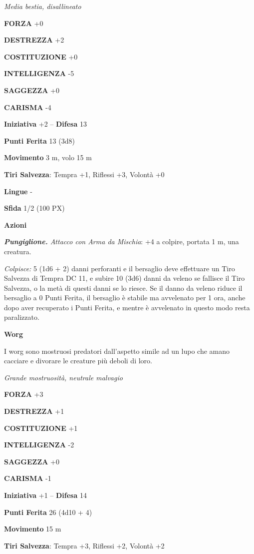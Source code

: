 \begin{multicols}{2}
\textit{Media bestia, disallineato}

\textbf{FORZA} +0

\textbf{DESTREZZA} +2

\textbf{COSTITUZIONE} +0

\textbf{INTELLIGENZA} -5

\textbf{SAGGEZZA} +0

\textbf{CARISMA} -4

\textbf{Iniziativa} +2 -- \textbf{Difesa} 13

\textbf{Punti Ferita} 13 (3d8)

\textbf{Movimento} 3 m, volo 15 m

\textbf{Tiri Salvezza}: Tempra +1, Riflessi +3, Volontà +0

\textbf{Lingue} -

\textbf{Sfida} 1/2 (100 PX)

\textbf{Azioni}

\textit{\textbf{Pungiglione.} Attacco con Arma da Mischia}: +4 a colpire, portata 1 m, una creatura.

\textit{Colpisce:} 5 (1d6 + 2) danni perforanti e il bersaglio deve effettuare un Tiro Salvezza di Tempra DC 11, e subire 10 (3d6) danni da veleno se fallisce il Tiro Salvezza, o la metà di questi danni se lo riesce. Se il danno da veleno riduce il bersaglio a 0 Punti Ferita, il bersaglio è stabile ma avvelenato per 1 ora, anche dopo aver recuperato i Punti Ferita, e mentre è avvelenato in questo modo resta paralizzato.

\medskip\textbf{Worg}

I worg sono mostruosi predatori dall'aspetto simile ad un lupo che amano cacciare e divorare le creature più deboli di loro.

\textit{Grande mostruosità, neutrale malvagio}

\textbf{FORZA} +3

\textbf{DESTREZZA} +1

\textbf{COSTITUZIONE} +1

\textbf{INTELLIGENZA} -2

\textbf{SAGGEZZA} +0

\textbf{CARISMA} -1

\textbf{Iniziativa} +1 -- \textbf{Difesa} 14

\textbf{Punti Ferita} 26 (4d10 + 4)

\textbf{Movimento} 15 m

\textbf{Tiri Salvezza}: Tempra +3, Riflessi +2, Volontà +2


\end{multicols}
